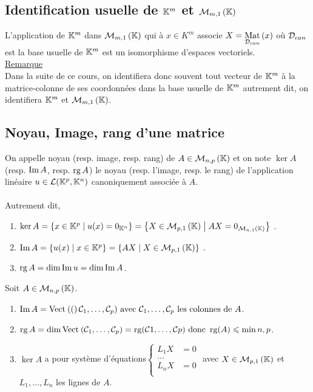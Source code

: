 \subsection{Identification usuelle de \(\K^m\) et \(\M{m,1}\)}
\begin{defprop}
    L’application de \(\K^m\) dans \(\M{m,1}\) qui à \(x \in K^m\) associe \(X = \Mat{\cal{D}_{can}}{x}\) où \(\cal{D}_{can}\) est la base usuelle de \(\K^m\) est un isomorphisme d’espaces vectoriels.\\
    \underline{Remarque} \\
    Dans la suite de ce cours, on identifiera donc souvent tout vecteur de \(\K^m\) à la matrice-colonne de ses coordonnées dans la base usuelle de \(\K^m\) autrement dit, on identifiera \(\K^m\) et \(\M{m,1}\).
\end{defprop}

\subsection{Noyau, Image, rang d’une matrice}
\begin{defi}
    On appelle noyau (resp. image, resp. rang) de \(A \in \M{n,p}\) et on note \(\ker A\) (resp. \(\im A\), resp. \(\rg A\)) le noyau (resp. l’image, resp. le rang) de l’application linéaire \(u \in \cal{L} (\K^p, \K^n)\) canoniquement associée à \(A\).\\~\\
    Autrement dit,
    \begin{enumerate}
        \item \(\ker A = \accol{x \in \K^p \tq u(x) = 0_{\K^n} } = \accol{X \in \M{p,1} \tq AX = 0_{\M{n,1}}}\) .
        \item \(\im A = \accol{u(x)\tq x \in \K^p} = \accol{AX\tq X \in \M{p,1}}\) .
        \item \(\rg A = \dim \im u = \dim \im A\).  
    \end{enumerate}
\end{defi}

\begin{prop}
    Soit \(A \in \M{n,p}\).
    \begin{enumerate}
        \item \(\im A = \Vect (\cal{C}_1, \dots , \cal{C}_p) \text{ avec } \cal{C}_1, \dots , \cal{C}_p \text{ les colonnes de  }A\).
        \item \(\rg A = \dim \Vect{\cal{C}_1, \dots , \cal{C}_p} = \rg (\cal{C}1, \dots , \cal{C}p) \text{ donc }\rg(A) \leq  \min{n, p}\).
        \item \(\ker A\) a pour système d’équations\(
        \begin{cases}            
            L_1X &= 0\\
            \dots\\
            L_nX &= 0\\
            \end{cases}
            \)
            avec \(X \in \M{p,1}\) et \(L_1, \dots , L_n\) les lignes de \(A\).
    \end{enumerate}
\end{prop}

